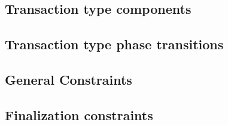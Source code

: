 \subsection{Transaction type \rlp{} components}              \label{rlp txn v2: generalities: transaction type rlp components}    
\subsection{Transaction type phase transitions}              \label{rlp txn v2: generalities: admissible rlp component flags}     
\subsection{General Constraints}                             \label{rlp txn v2: generalities: indices and limb constructed}       
\subsection{Finalization constraints}                        \label{rlp txn v2: generalities: heartbeat}                          
